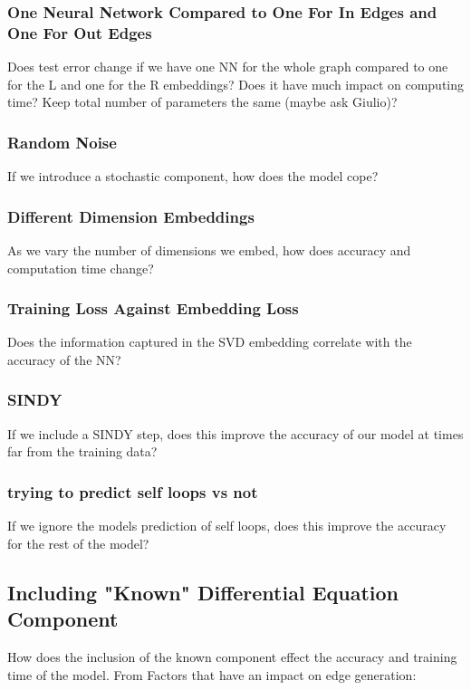 \documentclass[12pt]{article}
\begin{document}
            \subsubsection{One Neural Network Compared to One For In Edges and One For Out Edges}
                Does test error change if we have one NN for the whole graph compared to one for the L and one for the R embeddings? Does it have much impact on computing time? Keep total number of parameters the same (maybe ask Giulio)?
            \subsubsection{Random Noise}
                If we introduce a stochastic component, how does the model cope?
            \subsubsection{Different Dimension Embeddings}
                As we vary the number of dimensions we embed, how does accuracy and computation time change?
            \subsubsection{Training Loss Against Embedding Loss}
                Does the information captured in the SVD embedding correlate with the accuracy of the NN?
            \subsubsection{SINDY}
                If we include a SINDY step, does this improve the accuracy of our model at times far from the training data?
            \subsubsection{trying to predict self loops vs not}
                If we ignore the models prediction of self loops, does this improve the accuracy for the rest of the model?
            \subsection{Including "Known" Differential Equation Component}
                How does the inclusion of the known component effect the accuracy and training time of the model.
                From \cite{garg2009evolution}
                Factors that have an impact on edge generation:
                    
\end{document}

